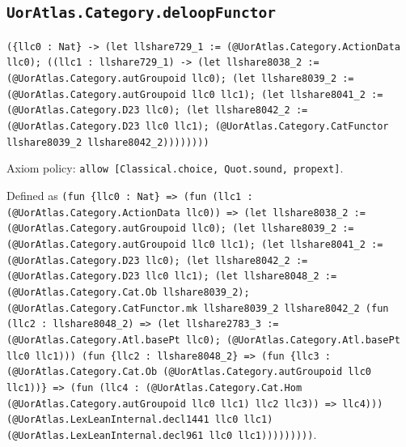 \documentclass[11pt]{article}
\begin{document}
\subsection*{\texttt{UorAtlas.Category.deloopFunctor}}
\noindent\texttt{(\{llc0 : Nat\} -> (let llshare729\_1 := (@UorAtlas.Category.ActionData llc0); ((llc1 : llshare729\_1) -> (let llshare8038\_2 := (@UorAtlas.Category.autGroupoid llc0); (let llshare8039\_2 := (@UorAtlas.Category.autGroupoid llc0 llc1); (let llshare8041\_2 := (@UorAtlas.Category.D23 llc0); (let llshare8042\_2 := (@UorAtlas.Category.D23 llc0 llc1); (@UorAtlas.Category.CatFunctor llshare8039\_2 llshare8042\_2))))))))}\par
\noindent Axiom policy: \texttt{allow [Classical.choice, Quot.sound, propext]}.\par
\noindent Defined as \texttt{(fun \{llc0 : Nat\} => (fun (llc1 : (@UorAtlas.Category.ActionData llc0)) => (let llshare8038\_2 := (@UorAtlas.Category.autGroupoid llc0); (let llshare8039\_2 := (@UorAtlas.Category.autGroupoid llc0 llc1); (let llshare8041\_2 := (@UorAtlas.Category.D23 llc0); (let llshare8042\_2 := (@UorAtlas.Category.D23 llc0 llc1); (let llshare8048\_2 := (@UorAtlas.Category.Cat.Ob llshare8039\_2); (@UorAtlas.Category.CatFunctor.mk llshare8039\_2 llshare8042\_2 (fun (llc2 : llshare8048\_2) => (let llshare2783\_3 := (@UorAtlas.Category.Atl.basePt llc0); (@UorAtlas.Category.Atl.basePt llc0 llc1))) (fun \{llc2 : llshare8048\_2\} => (fun \{llc3 : (@UorAtlas.Category.Cat.Ob (@UorAtlas.Category.autGroupoid llc0 llc1))\} => (fun (llc4 : (@UorAtlas.Category.Cat.Hom (@UorAtlas.Category.autGroupoid llc0 llc1) llc2 llc3)) => llc4))) (@UorAtlas.LexLeanInternal.decl1441 llc0 llc1) (@UorAtlas.LexLeanInternal.decl961 llc0 llc1)))))))))}.\par
\end{document}
